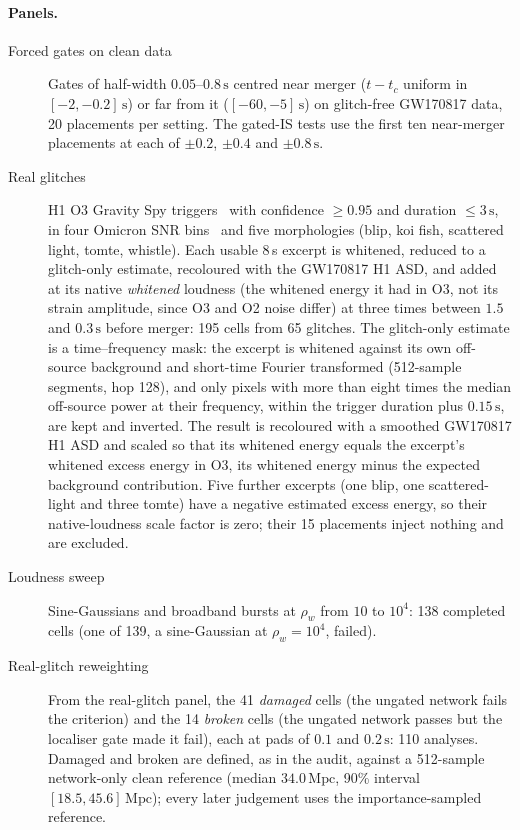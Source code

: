 \documentclass{openjournal}
\begin{document}
\paragraph{Panels.}
\begin{description}
\item[Forced gates on clean data] Gates of half-width $0.05$--$0.8\,\mathrm{s}$ centred near merger ($t-t_c$ uniform in $[-2,-0.2]\,\mathrm{s}$) or far from it ($[-60,-5]\,\mathrm{s}$) on glitch-free GW170817 data, 20 placements per setting.
The gated-IS tests use the first ten near-merger placements at each of $\pm0.2$, $\pm0.4$ and $\pm0.8\,\mathrm{s}$.
\item[Real glitches] H1 O3 Gravity Spy triggers~\cite{Zevin2017gravityspy,Glanzer2023gravityspy} with confidence $\ge0.95$ and duration $\le3\,\mathrm{s}$, in four Omicron SNR bins~\cite{Robinet2020omicron} and five morphologies (blip, koi fish, scattered light, tomte, whistle).
Each usable 8\,s excerpt is whitened, reduced to a glitch-only estimate, recoloured with the GW170817 H1 ASD, and added at its native \emph{whitened} loudness (the whitened energy it had in O3, not its strain amplitude, since O3 and O2 noise differ) at three times between $1.5$ and $0.3\,\mathrm{s}$ before merger: 195 cells from 65 glitches. The glitch-only estimate is a time--frequency mask: the excerpt is whitened against its own off-source background and short-time Fourier transformed (512-sample segments, hop 128), and only pixels with more than eight times the median off-source power at their frequency, within the trigger duration plus $0.15\,\mathrm{s}$, are kept and inverted. The result is recoloured with a smoothed GW170817 H1 ASD and scaled so that its whitened energy equals the excerpt's whitened excess energy in O3, its whitened energy minus the expected background contribution.
Five further excerpts (one blip, one scattered-light and three tomte) have a negative estimated excess energy, so their native-loudness scale factor is zero; their 15 placements inject nothing and are excluded.
\item[Loudness sweep] Sine-Gaussians and broadband bursts at $\rho_w$ from $10$ to $10^{4}$: 138 completed cells (one of 139, a sine-Gaussian at $\rho_w=10^{4}$, failed).
\item[Real-glitch reweighting] From the real-glitch panel, the 41 \emph{damaged} cells (the ungated network fails the criterion) and the 14 \emph{broken} cells (the ungated network passes but the localiser gate made it fail), each at pads of $0.1$ and $0.2\,\mathrm{s}$: 110 analyses. Damaged and broken are defined, as in the audit, against a 512-sample network-only clean reference (median $34.0\,\mathrm{Mpc}$, 90\% interval $[18.5, 45.6]\,\mathrm{Mpc}$); every later judgement uses the importance-sampled reference.

\end{description}
\end{document}
